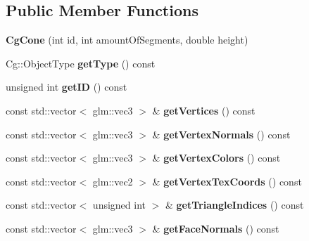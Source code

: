 \subsection*{Public Member Functions}
\begin{DoxyCompactItemize}
\item 
\mbox{\label{class_cg_cone_a1042bb360f1625ce55047b104575fcc9}} 
{\bfseries Cg\+Cone} (int id, int amount\+Of\+Segments, double height)
\item 
\mbox{\label{class_cg_cone_a9f3ae142d4487fe9a561898c7c0bcb2d}} 
Cg\+::\+Object\+Type {\bfseries get\+Type} () const
\item 
\mbox{\label{class_cg_cone_a2c566e0f093fe06ae33a5bd9dfc3b987}} 
unsigned int {\bfseries get\+ID} () const
\item 
\mbox{\label{class_cg_cone_aa55634b8dc226167da523021c2591599}} 
const std\+::vector$<$ glm\+::vec3 $>$ \& {\bfseries get\+Vertices} () const
\item 
\mbox{\label{class_cg_cone_a570da266b5a3ffb16bae05631f47e926}} 
const std\+::vector$<$ glm\+::vec3 $>$ \& {\bfseries get\+Vertex\+Normals} () const
\item 
\mbox{\label{class_cg_cone_a2eaf8c1fe2453bf07550159c69044ec6}} 
const std\+::vector$<$ glm\+::vec3 $>$ \& {\bfseries get\+Vertex\+Colors} () const
\item 
\mbox{\label{class_cg_cone_a6693019a7463a7dbd154e33405d9ad5b}} 
const std\+::vector$<$ glm\+::vec2 $>$ \& {\bfseries get\+Vertex\+Tex\+Coords} () const
\item 
\mbox{\label{class_cg_cone_a3241eb79020f50f8857cc276d98a5184}} 
const std\+::vector$<$ unsigned int $>$ \& {\bfseries get\+Triangle\+Indices} () const
\item 
\mbox{\label{class_cg_cone_a2de2f916adc3312259efd3c11d21a8d0}} 
const std\+::vector$<$ glm\+::vec3 $>$ \& {\bfseries get\+Face\+Normals} () const
\item 
\mbox{\label{class_cg_cone_a922ccac39bfae0410c508a419fea1453}} 

\end{DoxyCompactItemize}
